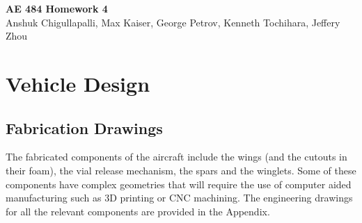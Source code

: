 




\begin{center}
    {\Large\textbf{AE 484 Homework 4}}\\
    Anshuk Chigullapalli, Max Kaiser, George Petrov, Kenneth Tochihara, Jeffery Zhou\\
\end{center}

\section{Vehicle Design}

    \subsection{Fabrication Drawings}
    
    The fabricated components of the aircraft include the  wings (and the cutouts in their foam), the vial release mechanism, the spars and the winglets. Some of these components have complex geometries that will require the use of computer aided manufacturing such as 3D printing or CNC machining. The engineering drawings for all the relevant components are provided in the Appendix.
    

